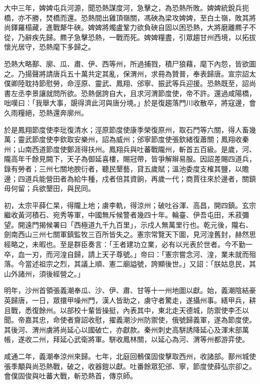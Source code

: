 \begin{pinyinscope}
 大中三年，婢婢屯兵河源，聞恐熱謀度河，急擊之，為恐熱所敗。婢婢統銳兵扼橋，亦不勝，焚橋而還。恐熱間出雞頂嶺關，馮硤為梁攻婢婢，至白土嶺，敗其將尚鐸羅榻藏，進戰犛牛硤。婢婢將燭盧鞏力欲負硤自固以困恐熱，大將磨離羆子不從，乃辭疾先歸。羆子急擊恐熱，一戰而死。婢婢糧盡，引眾趨甘州西境，以拓拔懷光居守，恐熱麾下多歸之。



 恐熱大略鄯、廓、瓜、肅、伊、西等州，所過捕戮，積尸狼藉，麾下內怨，皆欲圖之。乃揚聲將請唐兵五十萬共定其亂，保渭州，求冊為贊普，奉表歸唐。宣宗詔太僕卿陸耽持節慰勞，命涇原、靈武、鳳翔、邠寧、振武等兵迎援。恐熱既至，詔尚書左丞李景讓就問所欲。恐熱倨誇自大，且求河渭節度使，帝不許。還過咸陽橋，咄嘆曰：「我舉大事，覬得濟此河與唐分境。」於是復趨落門川收散卒，將寇邊，會久雨糧絕，恐熱還奔廓州。



 於是鳳翔節度使李玭復清水；涇原節度使康季榮復原州，取石門等六關，得人畜幾萬；靈武節度使李欽取安樂州，詔為威州；邠寧節度使張欽緒復蕭關；鳳翔收秦州；山南西道節度使鄭涯得扶州。鳳翔兵與吐蕃戰隴州，斬首五百級。是歲，河、隴高年千餘見闕下，天子為御延喜樓，賜冠帶，皆爭解辮易服。因詔差賜四道兵，錄有勞者；三州七關地腴衍者，聽民墾藝，貸五歲賦；溫池委度支榷其鹽，以贍邊；四道兵能營田者為給牛種，戍者倍其資餉，再歲一代；商賈往來於邊者，關鎮毋何留；兵欲墾田，與民同。



 初，太宗平薛仁杲，得隴上地；虜李軌，得涼州；破吐谷渾、高昌，開四鎮。玄宗繼收黃河積石、宛秀等軍，中國無斥候警者幾四十年。輪臺、伊吾屯田，禾菽彌望。開遠門揭候署曰「西極道九千九百里」，示戍人無萬里行也。乾元後，隴右、劍南西山三州七關軍鎮監牧三百所皆失之。憲宗常覽天下圖，見河湟舊封，赫然思經略之，未暇也。至是群臣奏言：「王者建功立業，必有以光表於世者。今不勤一卒，血一刃，而河湟自歸，請上天子尊號。」帝曰：「憲宗嘗念河、湟，業未就而殂落。今當述祖宗之烈，其議上順、憲二廟謚號，誇顯後世。」又詔：「朕姑息民，其山外諸州，須後經營之。」



 明年，沙州首領張義潮奉瓜、沙、伊、肅、甘等十一州地圖以獻。始，義潮陰結豪英歸唐，一日，眾擐甲噪州門，漢人皆助之，虜守者驚走，遂攝州事。繕甲兵，耕且戰，悉復餘州。以部校十輩皆操挺，內表其中，東北走天德城，防禦使李丕以聞。帝嘉其忠，命使者齎詔收慰，擢義潮沙州防禦使，俄號歸義軍，遂為節度使。其後河、渭州虜將尚延心以國破亡，亦獻款。秦州刺史高駢誘降延心及渾末部萬帳，遂收二州，拜延心武衛將軍。駢收鳳林關，以延心為河、渭等州都游弈使。



 咸通二年，義潮奉涼州來歸。七年，北庭回鶻僕固俊擊取西州，收諸部。鄯州城使張季顒與尚恐熱戰，破之，收器鎧以獻。吐番餘眾犯邠、寧，節度使薛弘宗卻之。會僕固俊與吐蕃大戰，斬恐熱首，傳京師。




\end{pinyinscope}
